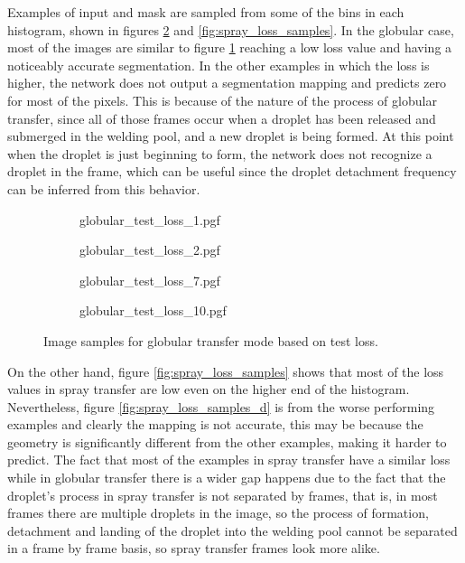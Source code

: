 Examples of input and mask are sampled from some of the bins in each histogram, shown in figures \ref{fig:globular_loss_samples} and \ref{fig:spray_loss_samples}. In the globular case, most of the images are similar to figure \ref{fig:globular_loss_samples_a} reaching a low loss value and having a noticeably accurate segmentation. In the other examples in which the loss is higher, the network does not output a segmentation mapping and predicts zero for most of the pixels. This is because of the nature of the process of globular transfer, since all of those frames occur when a droplet has been released and submerged in the welding pool, and a new droplet is being formed. At this point when the droplet is just beginning to form, the network does not recognize a droplet in the frame, which can be useful since the droplet detachment frequency can be inferred from this behavior.

\begin{figure}
  \begin{subfigure}[b]{0.45\textwidth}
    {globular_test_loss_1.pgf}
    \caption{}
    \label{fig:globular_loss_samples_a}
  \end{subfigure}
\hfill
  \begin{subfigure}[b]{0.45\textwidth}
    {globular_test_loss_2.pgf}
    \caption{}
  \end{subfigure}
 \vfill
  \begin{subfigure}[b]{0.45\textwidth}
    {globular_test_loss_7.pgf}
    \caption{}
  \end{subfigure}
\hfill
  \begin{subfigure}[b]{0.45\textwidth}
    {globular_test_loss_10.pgf}
    \caption{}
  \end{subfigure}
  \caption[Image samples for globular transfer mode based on test loss]{Image samples for globular transfer mode based on test loss.}
  \label{fig:globular_loss_samples}
\end{figure}

On the other hand, figure \ref{fig:spray_loss_samples} shows that most of the loss values in spray transfer are low even on the higher end of the histogram. Nevertheless, figure \ref{fig:spray_loss_samples_d} is from the worse performing examples and clearly the mapping is not accurate, this may be because the geometry is significantly different from the other examples, making it harder to predict. The fact that most of the examples in spray transfer have a similar loss while in globular transfer there is a wider gap happens due to the fact that the droplet's process in spray transfer is not separated by frames, that is, in most frames there are multiple droplets in the image, so the process of formation, detachment and landing of the droplet into the welding pool cannot be separated in a frame by frame basis, so spray transfer frames look more alike.

